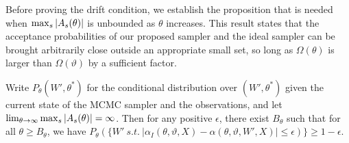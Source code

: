 \noindent Before proving the drift condition, we establish the proposition that
is needed when ${\max_s |A_s(\theta)|}$ is unbounded as $\theta$ increases.
This result states that the acceptance probabilities of our proposed
sampler and the ideal sampler can be brought arbitrarily close
outside an appropriate small set, so long as $\Omega(\theta)$ is larger
than $\Omega(\vartheta)$ by a sufficient factor. 
\begin{proposition}
  Write $P_{\theta}(W',\theta^*)$ for the conditional distribution 
  over $(W',\theta^*)$ given the current state of the MCMC sampler and the 
  observations, and let
  $\lim_{\theta\rightarrow\infty} {\max_s |A_s(\theta)|} = \infty$. Then for any positive 
  $\epsilon$, there exist $B_\theta$ such that for all 
  $\theta \ge B_\theta$, %
  we have 
  $P_{\theta}(\{W'\ s.t.\ |\alpha_I(\theta,\vartheta,X) - \alpha(\theta,\vartheta,W',X)| 
  \le \epsilon)\} \ge 1-\epsilon$.%
\label{prop:mix}
\end{proposition}
